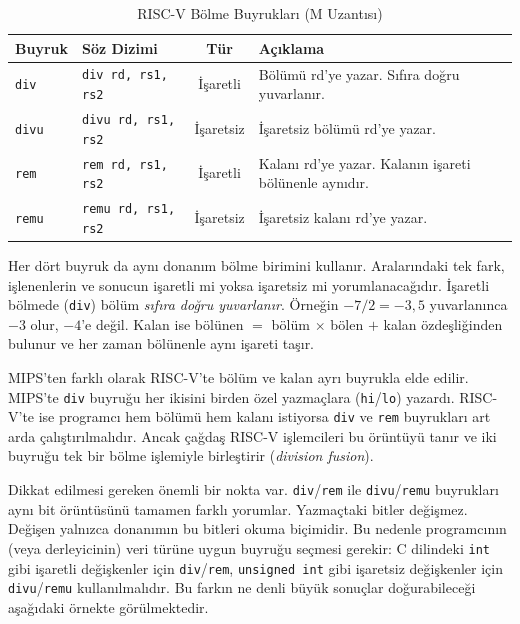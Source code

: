 \begin{table}[htbp]
\centering
\caption{RISC-V Bölme Buyrukları (M Uzantısı)}
\label{tab:bolme-buyruklar}
\small
\begin{tabularx}{\textwidth}{l l c X}
\toprule
\textbf{Buyruk} & \textbf{Söz Dizimi} & \textbf{Tür} & \textbf{Açıklama} \\
\midrule
\texttt{div} & \texttt{div rd, rs1, rs2} & İşaretli & Bölümü rd'ye yazar. Sıfıra doğru yuvarlanır. \\
\texttt{divu} & \texttt{divu rd, rs1, rs2} & İşaretsiz & İşaretsiz bölümü rd'ye yazar. \\
\texttt{rem} & \texttt{rem rd, rs1, rs2} & İşaretli & Kalanı rd'ye yazar. Kalanın işareti bölünenle aynıdır. \\
\texttt{remu} & \texttt{remu rd, rs1, rs2} & İşaretsiz & İşaretsiz kalanı rd'ye yazar. \\
\bottomrule
\end{tabularx}
\end{table}

Her dört buyruk da aynı donanım bölme birimini kullanır. Aralarındaki tek fark, işlenenlerin ve sonucun işaretli mi yoksa işaretsiz mi yorumlanacağıdır. İşaretli bölmede (\texttt{div}) bölüm \emph{sıfıra doğru yuvarlanır}. Örneğin $-7 / 2 = -3{,}5$ yuvarlanınca $-3$ olur, $-4$'e değil. Kalan ise bölünen $=$ bölüm $\times$ bölen $+$ kalan özdeşliğinden bulunur ve her zaman bölünenle aynı işareti taşır.

MIPS'ten farklı olarak RISC-V'te bölüm ve kalan ayrı buyrukla elde edilir. MIPS'te \texttt{div} buyruğu her ikisini birden özel yazmaçlara (\texttt{hi}/\texttt{lo}) yazardı. RISC-V'te ise programcı hem bölümü hem kalanı istiyorsa \texttt{div} ve \texttt{rem} buyrukları art arda çalıştırılmalıdır. Ancak çağdaş RISC-V işlemcileri bu örüntüyü tanır ve iki buyruğu tek bir bölme işlemiyle birleştirir (\emph{division fusion}).

Dikkat edilmesi gereken önemli bir nokta var. \texttt{div}/\texttt{rem} ile \texttt{divu}/\texttt{remu} buyrukları aynı bit örüntüsünü tamamen farklı yorumlar. Yazmaçtaki bitler değişmez. Değişen yalnızca donanımın bu bitleri okuma biçimidir. Bu nedenle programcının (veya derleyicinin) veri türüne uygun buyruğu seçmesi gerekir: C dilindeki \texttt{int} gibi işaretli değişkenler için \texttt{div}/\texttt{rem}, \texttt{unsigned int} gibi işaretsiz değişkenler için \texttt{divu}/\texttt{remu} kullanılmalıdır. Bu farkın ne denli büyük sonuçlar doğurabileceği aşağıdaki örnekte görülmektedir.

